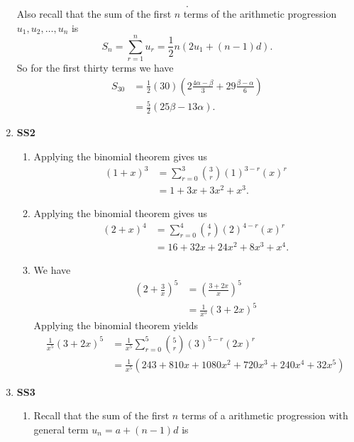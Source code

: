 \documentclass[12pt,oneside]{book}
\begin{document}
\begin{enumerate}
\[        .\] Also recall that the sum of the first $n$ terms of the arithmetic progression $u_1, u_2, \ldots, u_n$ is \[
            S_n = \sum_{r=1}^{n} u_r = \frac{1}{2} n (2u_1 + (n-1)d)  
        .\] So for the first thirty terms we have \begin{align*}
            S_{30} &= \frac{1}{2} (30) \left( 2 \frac{4 \alpha - \beta}{3} + 29 \frac{\beta - \alpha}{6} \right) \\
            &= \frac{5}{2} \left( 25 \beta -13 \alpha \right).
        \end{align*}
	\item \textbf{SS2} \begin{enumerate} 
            \item Applying the binomial theorem gives us \begin{align*}
                (1 + x)^3 &= \sum_{r = 0}^{3} {3 \choose r} (1)^{3 - r} (x)^{r} \\
                &= 1 + 3x + 3x^2 + x^3.
            \end{align*}
            \item Applying the binomial theorem gives us \begin{align*}
                (2 + x)^4 &= \sum_{r = 0}^{4} {4 \choose r} (2)^{4 - r} (x)^{r} \\
                &= 16 + 32 x + 24 x^2 + 8 x^3 + x^4.
            \end{align*}
            \item We have \begin{align*}
                \left( 2 + \frac{3}{x} \right) ^5 &= \left( \frac{3 + 2x}{x} \right)^5 \\
                &= \frac{1}{x^5} (3 + 2x)^5 
            \end{align*}
            Applying the binomial theorem yields \begin{align*}
                \frac{1}{x^5} (3 + 2x)^5 &= \frac{1}{x^5} \sum_{r = 0}^{5} {5 \choose r} (3)^{5 - r} (2x)^{r} \\
                &= \frac{1}{x^5} \left( 243 + 810x + 1080 x^2 + 720 x^3 + 240 x^4 + 32 x^5 \right)
            \end{align*}
        \end{enumerate}
        \item \textbf{SS3} \begin{enumerate}
            \item Recall that the sum of the first $n$ terms of a arithmetic progression with general term $u_n = a + (n-1)d$ is \[
\]
\end{enumerate}
\end{enumerate}
\end{document}
